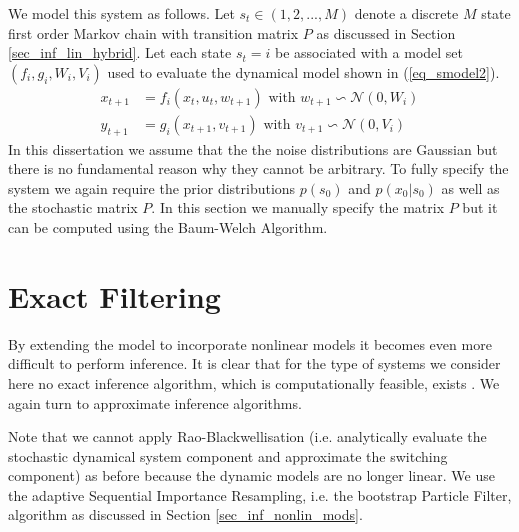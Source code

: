 We model this system as follows. Let $s_t \in (1,2,..., M)$ denote a discrete $M$ state first order Markov chain with transition matrix $P$ as discussed in Section \ref{sec_inf_lin_hybrid}. Let each state $s_t=i$ be associated with a model set $\left(f_i, g_i, W_i, V_i \right)$ used to evaluate the dynamical model shown in (\ref{eq_smodel2}).
\begin{equation}
\begin{aligned}
x_{t+1} &= f_i(x_t, u_t, w_{t+1}) \text{ with } w_{t+1} \backsim \mathcal{N}(0, W_i)\\
y_{t+1} &= g_i(x_{t+1}, v_{t+1}) \text{ with } v_{t+1} \backsim \mathcal{N}(0,V_i)
\end{aligned}
\label{eq_smodel2}
\end{equation}
In this dissertation we assume that the the noise distributions are Gaussian but there is no fundamental reason why they cannot be arbitrary. To fully specify the system we again require the prior distributions $p(s_0)$ and $p(x_0|s_0)$ as well as the stochastic matrix $P$. In this section we manually specify the matrix $P$ but it can be computed using the Baum-Welch Algorithm. 
\section{Exact Filtering}
By extending the model to incorporate nonlinear models it becomes even more difficult to perform inference. It is clear that for the type of systems we consider here no exact inference algorithm, which is computationally feasible, exists \cite{murphy1}. We again turn to approximate inference algorithms.

Note that we cannot apply Rao-Blackwellisation (i.e. analytically evaluate the stochastic dynamical system component and approximate the switching component) as before because the dynamic models are no longer linear. We use the adaptive Sequential Importance Resampling, i.e. the bootstrap Particle Filter, algorithm as discussed in Section \ref{sec_inf_nonlin_mods}.
